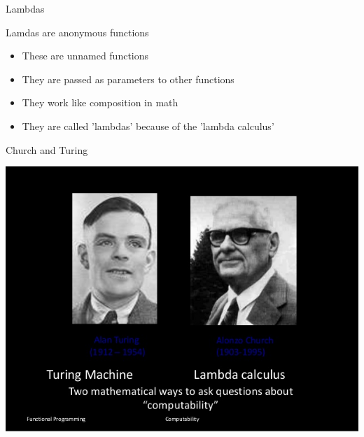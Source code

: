 \documentclass[presetation]{beamer}
\begin{document}
\begin{frame}[label={sec:orga23ea31}]{Lambdas}
\begin{block}{Lamdas are anonymous functions}
\begin{itemize}
\item These are unnamed functions
\item They are passed as parameters to other functions
\item They work like composition in math
\item They are called 'lambdas' because of the 'lambda calculus'
\end{itemize}
\end{block}
\end{frame}

\begin{frame}[label={sec:org9a33b75}]{Church and Turing}
\begin{center}
\includegraphics[width=.9\linewidth]{images/computability.jpg}
\end{center}
\end{frame}
\end{document}
